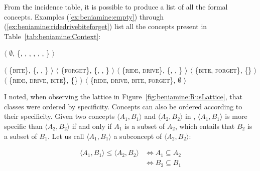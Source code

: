 \documentclass[output=paper]{langscibook}
\begin{document}
    From the incidence table, it is possible to produce a list of all the formal concepts. Examples (\ref{ex:beniamine:empty}) through (\ref{ex:beniamine:ridedrivebiteforget}) list all the concepts present in Table~\ref{tab:beniamine:Context}:
    
    \begin{exe}
        \ex \label{ex:beniamine:empty}
        \begin{sloppypar}
          $\langle$ $\emptyset$, \{, ,
          , , , ,  \} $\rangle$

        \end{sloppypar} 
        \ex \label{ex:beniamine:bite} $\langle$ \{\textsc{bite}\},  \{, , \} $\rangle$
        \ex \label{ex:beniamine:forget} $\langle$ \{\textsc{forget}\},  \{, , \} $\rangle$
        \ex \label{ex:beniamine:ridedrive} $\langle$ \{\textsc{ride}, \textsc{drive}\},  \{, , \} $\rangle$
        \ex \label{ex:beniamine:biteforget} $\langle$ \{\textsc{bite}, \textsc{forget}\},  \{\} $\rangle$
        \ex \label{ex:beniamine:ridedrivebite} $\langle$ \{\textsc{ride}, \textsc{drive}, \textsc{bite}\},  \{\} $\rangle$
        \ex \label{ex:beniamine:ridedrivebiteforget} $\langle$ \{\textsc{ride}, \textsc{drive}, \textsc{bite}, \textsc{forget}\},  $\emptyset$ $\rangle$
    \end{exe}
    
    I noted, when observing the lattice in Figure~\ref{fig:beniamine:RusLattice}, that classes were ordered by specificity. Concepts can also be ordered according to their specificity. Given two concepts $\langle A_{1},B_{1} \rangle$ and $\langle A_{2},B_{2} \rangle$ in \context{}, $\langle A_{1},B_{1} \rangle$ is more specific than $\langle A_{2},B_{2} \rangle$ if and only if $A_{1}$ is a subset of $A_{2}$, which entails that $B_{2}$ is a subset of $B_{1}$. Let us call $\langle A_{1},B_{1} \rangle$ a subconcept of $\langle A_{2},B_{2} \rangle$:
    
    \begin{align*}
    \langle A_{1},B_{1} \rangle \leq \langle A_{2},B_{2} \rangle & \iff A_{1} \subseteq A_2\\
    & \iff B_{2} \subseteq B_1
    \end{align*}
    
\end{document}
